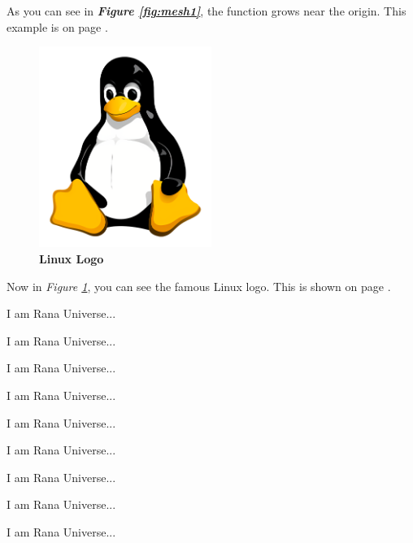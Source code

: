 \documentclass[12pt, letterpaper]{article}
\begin{document}
As you can see in \textbf{\textit{Figure \ref{fig:mesh1}}}, the function grows near the origin. This example is on page \pageref{fig:mesh1}.



\begin{figure}[htbp]
	\centering
	\includegraphics[width=0.5\textwidth]{linux_logo.png}
	\caption{\textbf{Linux Logo}}
	\label{fig:linuxlogo}
\end{figure}

Now in \textit{Figure \ref{fig:linuxlogo}}, you can see the famous Linux logo.
This is shown on page \pageref{fig:linuxlogo}.





\vspace{10em}

I am Rana Universe...

I am Rana Universe...

I am Rana Universe...

I am Rana Universe...

I am Rana Universe...

I am Rana Universe...

I am Rana Universe...

I am Rana Universe...

I am Rana Universe...

\vspace{3em}





\lipsum[1]

\lipsum[2]

\vspace{1em}

\lipsum[1]




\end{document}
